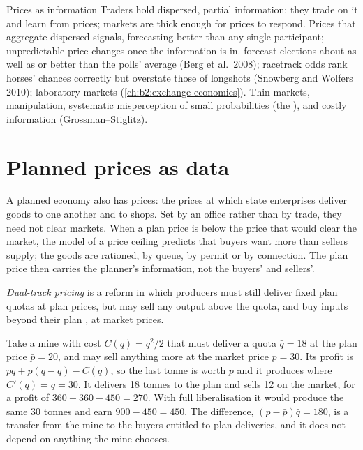\begin{model}{Prices as information}
\assumes Traders hold dispersed, partial information; they trade on it and learn from prices; markets
are thick enough for prices to respond.
\predicts Prices that aggregate dispersed signals, forecasting better than any single participant;
unpredictable price changes once the information is in.
\tested {} forecast elections about as well as or better than the polls' average
(Berg et al.\ 2008); racetrack odds rank horses' chances correctly but overstate those of longshots
(Snowberg and Wolfers 2010); laboratory markets (\cref{ch:b2:exchange-economies}).
\breaks Thin markets, manipulation, systematic misperception of small probabilities (the
), and costly information (Grossman--Stiglitz).
\end{model}

\section{Planned prices as data}\label{sec:b2:prices-as-information:plan}

A planned economy also has prices: the prices at which state enterprises deliver goods to one another
and to shops. Set by an office rather than by trade, they need not clear markets. When a plan price is
below the price that would clear the market, the model of a price ceiling predicts that buyers want more
than sellers supply; the goods are rationed, by queue, by permit or by connection. The plan price then
carries the planner's information, not the buyers' and sellers'.

\begin{definition}\label{def:b2:prices-as-information:dual-track}
\emph{Dual-track pricing} is a reform in which producers must still deliver
fixed plan quotas at plan prices, but may sell any output above the quota, and buy inputs beyond their
plan , at market prices.
\end{definition}

Take a mine with cost $C(q) = q^2/2$ that must deliver a quota $\bar q = 18$ at the plan price $\bar p = 20$,
and may sell anything more at the market price $p = 30$. Its profit is $\bar p\bar q + p(q - \bar q) - C(q)$, so
the last tonne is worth $p$ and it produces where $C'(q) = q = 30$. It delivers 18 tonnes to the plan and sells
12 on the market, for a profit of $360 + 360 - 450 = 270$. With full liberalisation it would produce the
same 30 tonnes and earn $900 - 450 = 450$. The difference, $(p - \bar p)\bar q = 180$, is a transfer from the
mine to the buyers entitled to plan deliveries, and it does not depend on anything the mine chooses.

